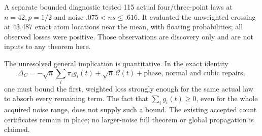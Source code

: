 \documentclass[11pt,a4paper]{article}
\begin{document}
A separate bounded diagnostic tested 115 actual four/three-point laws at
$n=42,p=1/2$ and noise $.075<ns\le.616$. It evaluated the unweighted
crossing at 43,487 exact atom locations near the mean, with floating
probabilities; all observed losses were positive. Those observations are
discovery only and are not inputs to any theorem here.

The unresolved general implication is quantitative. In the exact identity
\[
 \Delta_C=-\sqrt n\sum_i\pi_i g_i(t)
       +\sqrt n\,\mathcal C(t)+\text{phase, normal and cubic repairs},
\]
one must bound the first, weighted loss strongly enough for the same
actual law to absorb every remaining term. The fact that
$\sum_i g_i(t)\ge0$, even for the whole acquired noise range, does not
supply such a bound. The existing accepted count certificates remain in
place; no larger-noise full theorem or global propagation is claimed.
\end{document}
